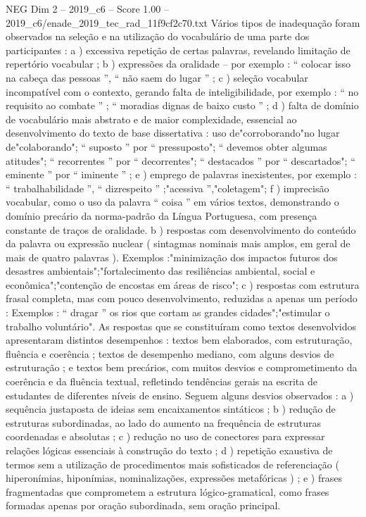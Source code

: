 \begin{textsample}{NEG Dim 2 – 2019\_c6 – Score 1.00 – 2019\_c6/enade\_2019\_tec\_rad\_11f9cf2c70.txt}
Vários tipos de inadequação foram observados na seleção e na utilização do vocabulário de uma parte dos participantes : a ) excessiva repetição de certas palavras, revelando limitação de repertório vocabular ; b ) expressões da oralidade – por exemplo : “ colocar isso na cabeça das pessoas ”, “ não saem do lugar ” ; c ) seleção vocabular incompatível com o contexto, gerando falta de inteligibilidade, por exemplo : “ no requisito ao combate ” ; “ moradias dignas de baixo custo ” ; d ) falta de domínio de vocabulário mais abstrato e de maior complexidade, essencial ao desenvolvimento do texto de base dissertativa : uso de"corroborando"no lugar de"colaborando"; “ suposto ” por “ pressuposto"; “ devemos obter algumas atitudes"; “ recorrentes ” por “ decorrentes"; “ destacados ” por “ descartados"; “ eminente ” por “ iminente ” ; e ) emprego de palavras inexistentes, por exemplo : “ trabalhabilidade ”, “ dizrespeito ” ;"acessiva ”,"coletagem"; f ) imprecisão vocabular, como o uso da palavra “ coisa ” em vários textos, demonstrando o domínio precário da norma-padrão da Língua Portuguesa, com presença constante de traços de oralidade. b ) respostas com desenvolvimento do conteúdo da palavra ou expressão nuclear ( sintagmas nominais mais amplos, em geral de mais de quatro palavras ).
Exemplos :"minimização dos impactos futuros dos desastres ambientais";"fortalecimento das resiliências ambiental, social e econômica";"contenção de encostas em áreas de risco"; c ) respostas com estrutura frasal completa, mas com pouco desenvolvimento, reduzidas a apenas um período : Exemplos : “ dragar ” os rios que cortam as grandes cidades";"estimular o trabalho voluntário".
As respostas que se constituíram como textos desenvolvidos apresentaram distintos desempenhos : textos bem elaborados, com estruturação, fluência e coerência ; textos de desempenho mediano, com alguns desvios de estruturação ; e textos bem precários, com muitos desvios e comprometimento da coerência e da fluência textual, refletindo tendências gerais na escrita de estudantes de diferentes níveis de ensino.
Seguem alguns desvios observados : a ) sequência justaposta de ideias sem encaixamentos sintáticos ; b ) redução de estruturas subordinadas, ao lado do aumento na frequência de estruturas coordenadas e absolutas ; c ) redução no uso de conectores para expressar relações lógicas essenciais à construção do texto ; d ) repetição exaustiva de termos sem a utilização de procedimentos mais sofisticados de referenciação ( hiperonímias, hiponímias, nominalizações, expressões metafóricas ) ; e ) frases fragmentadas que comprometem a estrutura lógico-gramatical, como frases formadas apenas por oração subordinada, sem oração principal.

\end{textsample}
